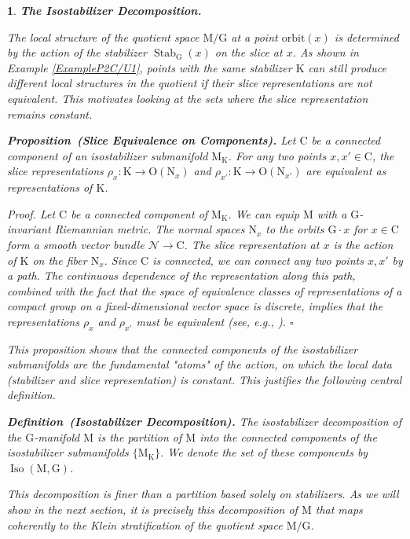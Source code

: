 \documentclass[10pt,reqno,letterpaper,twoside]{amsart}
\theoremstyle{article}
\newtheorem{article}{}
\def\artlabel[#1]{\textbf{#1.}}
\newenvironment{definition}[1]%
{\noindent\textbf{Definition#1.} \it}%
{}
\newenvironment{proposition}[1]%
{\noindent\textbf{Proposition#1.} \it}%
{}
\renewenvironment{proof}%
{\noindent\textit{Proof.}}%
{\nolinebreak\hfill $\square$}
\newcommand{\cN}{{\mathcal N}}
\def \C{\mathrm C}
\def \G{\mathrm G}
\def \K{\mathrm K}
\def \M{\mathrm M}
\def \N{\mathrm N}
\def \O{\mathrm O}
\DeclareMathOperator{\Iso}{Iso}
\DeclareMathOperator{\Stab}{Stab}
\newcommand{\orbit}{{\mathrm{orbit}}}
\def \O{\mathrm O}
\begin{document}
  \begin{article}
    \artlabel[The Isostabilizer Decomposition]
    \label{The_Isostabilizer_Decomposition_Def}
    
    The local structure of the quotient space $\M/\G$ at a point $\orbit(x)$ is determined by the action of the stabilizer $\Stab_\G(x)$ on the slice at $x$.
    As shown in Example \ref{ExampleP2C/U1},
    points with the same stabilizer $\K$ can still produce different local structures in the quotient if their slice representations are not equivalent.
    This motivates looking at the sets where the slice representation remains constant.
    
    \begin{proposition}{~(Slice Equivalence on Components)}
      \label{prop:slice_equivariance}
      Let $\C$ be a connected component of an isostabilizer submanifold $\M_\K$.
      For any two points $x, x' \in \C$,
      the slice representations $\rho_x: \K \to \O(\N_x)$ and $\rho_{x'}: \K \to \O(\N_{x'})$ are equivalent as representations of $\K$.
    \end{proposition}
    
    \begin{proof}
      Let $\C$ be a connected component of $\M_\K$.
      We can equip $\M$ with a $\G$-invariant Riemannian metric.
      The normal spaces $\N_x$ to the orbits $\G \cdot x$ for $x \in \C$ form a smooth vector bundle $\cN \to \C$.
      The slice representation at $x$ is the action of $\K$ on the fiber $\N_x$.
      Since $\C$ is connected,
      we can connect any two points $x, x'$ by a path.
      The continuous dependence of the representation along this path,
      combined with the fact that the space of equivalence classes of representations of a compact group on a fixed-dimensional vector space is discrete,
      implies that the representations $\rho_x$ and $\rho_{x'}$ must be equivalent (see, e.g., \cite{BT85, Fol95}).
    \end{proof}
    
    This proposition shows that the connected components of the isostabilizer submanifolds are the fundamental "atoms" of the action,
    on which the local data (stabilizer and slice representation) is constant.
    This justifies the following central definition.
    
    \begin{definition}{~(Isostabilizer Decomposition)}%
      The \emph{isostabilizer decomposition} of the $\G$-manifold $\M$ is the partition of $\M$ into the connected components of the isostabilizer submanifolds $\{\M_\K\}$.
      We denote the set of these components by $\Iso(\M,\G)$.
    \end{definition}
    
    This decomposition is finer than a partition based solely on stabilizers.
    As we will show in the next section,
    it is precisely this decomposition of $\M$ that maps coherently to the Klein stratification of the quotient space $\M/\G$.
    
    
  \end{article}
  
\end{document}
